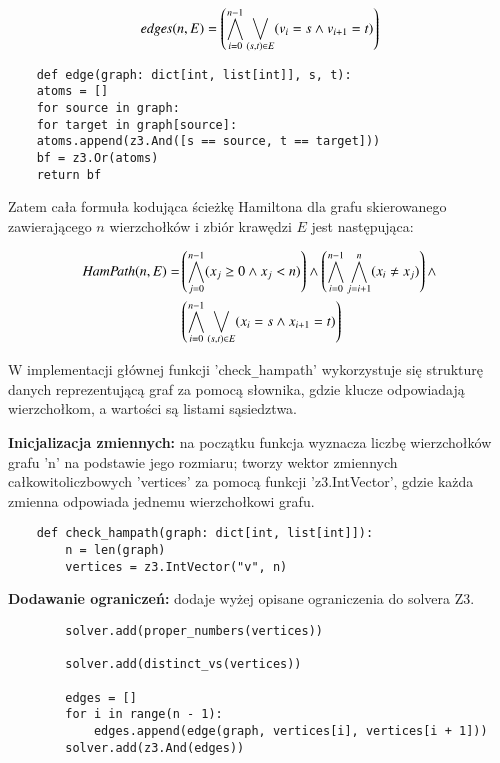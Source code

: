 \begin{align*}
	\mathit{edges}(n, E) = \left( \bigwedge_{i=0}^{n-1} \bigvee_{(s,t) \in E} (v_i = s \land v_{i+1} = t) \right)
\end{align*}

\begin{lstlisting}	
	def edge(graph: dict[int, list[int]], s, t):
	atoms = []
	for source in graph:
	for target in graph[source]:
	atoms.append(z3.And([s == source, t == target]))
	bf = z3.Or(atoms)
	return bf
\end{lstlisting}
\vspace{1cm}

Zatem cała formuła kodująca ścieżkę Hamiltona dla grafu skierowanego zawierającego \(n\) wierzchołków i zbiór krawędzi \(E\) jest następująca:

\begin{align*}
	{\mathit{HamPath}}(n, E) = & \left( \bigwedge_{j=0}^{n-1} (x_j \geq 0 \land x_j < n) \right) \land 
	\left( \bigwedge_{i=0}^{n-1} \bigwedge_{j=i+1}^{n} (x_i \neq x_j) \right) \land \\ 
	& \left( \bigwedge_{i=0}^{n-1} \bigvee_{(s,t) \in E} (x_i = s \land x_{i+1} = t) \right)
\end{align*}

W implementacji głównej funkcji 'check\verb|_|hampath' wykorzystuje się strukturę danych reprezentującą graf za pomocą słownika, gdzie klucze odpowiadają wierzchołkom, a wartości są listami sąsiedztwa.

\textbf{Inicjalizacja zmiennych: } na początku funkcja wyznacza liczbę wierzchołków grafu 'n' na podstawie jego rozmiaru; tworzy wektor zmiennych całkowitoliczbowych 'vertices' za pomocą funkcji 'z3.IntVector', gdzie każda zmienna odpowiada jednemu wierzchołkowi grafu.

\begin{lstlisting}	
	def check_hampath(graph: dict[int, list[int]]):
		n = len(graph)
		vertices = z3.IntVector("v", n)
\end{lstlisting}
	
\textbf{Dodawanie ograniczeń: } dodaje wyżej opisane ograniczenia do solvera Z3.

\begin{lstlisting}
		solver.add(proper_numbers(vertices))
	
		solver.add(distinct_vs(vertices))
	
		edges = []
		for i in range(n - 1):
			edges.append(edge(graph, vertices[i], vertices[i + 1]))
		solver.add(z3.And(edges))
\end{lstlisting}

